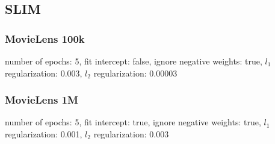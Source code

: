 \subsection{SLIM}
\subsubsection{MovieLens 100k}
number of epochs: 5, fit intercept: false, ignore negative weights: true, $l_1$ regularization: 0.003, $l_2$ regularization: 0.00003

\subsubsection{MovieLens 1M}
number of epochs: 5, fit intercept: true, ignore negative weights: true, $l_1$ regularization: 0.001, $l_2$ regularization: 0.003
